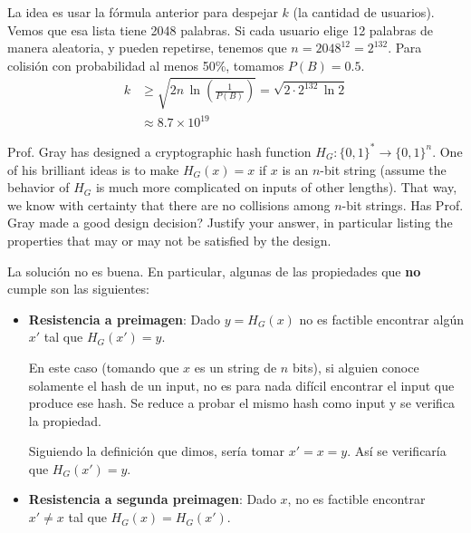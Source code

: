\documentclass[12pt,addpoints,answers]{exam}
\begin{document}
\begin{questions}
\begin{parts}
\begin{solution} %
    La idea es usar la fórmula anterior para despejar $k$ (la cantidad de usuarios).
    Vemos que esa lista tiene 2048 palabras. Si cada usuario elige 12 palabras de manera aleatoria, y 
    pueden repetirse, tenemos que $n = 2048^{12} = 2^{132}$. Para colisión con probabilidad al menos 50\%, tomamos $P(B)=0.5$.
    \begin{align*}
        k &\geq \sqrt{2n \, \ln\!\left(\tfrac{1}{P(B)}\right)} 
          = \sqrt{2 \cdot 2^{132} \, \ln 2} \\
          &\approx 8.7 \times 10^{19}
    \end{align*}
\end{solution}

\end{parts}

\newpage

\question[10] Prof. Gray has designed a cryptographic hash function $H_G : \{0, 1\}^\ast \rightarrow \{0, 1\}^n$. One of his brilliant ideas is to make $H_G(x) = x$ if $x$ is an $n$-bit string (assume the behavior of $H_G$ is much more complicated on inputs of other lengths). That way, we know with certainty that there are no collisions among $n$-bit strings. Has Prof. Gray made a good design decision? Justify your answer, in particular listing the properties that may or may not be satisfied by the design.

\begin{solution} %
   La solución no es buena.
   En particular, algunas de las propiedades que \textbf{no} cumple son las siguientes:
   \begin{itemize}
    \item \textbf{Resistencia a preimagen}: Dado $y = H_G(x)$ 
    no es factible encontrar algún $x'$ tal que $H_G(x') = y$.

    En este caso (tomando que $x$ es un string de $n$ bits), si alguien conoce solamente el hash
    de un input, no es para nada difícil encontrar el input que produce ese hash.
    Se reduce a probar el mismo hash como input y se verifica la propiedad. 
    
    Siguiendo la definición que dimos, sería tomar $x' = x = y$. 
    Así se verificaría que $H_G(x') = y$.

    \item \textbf{Resistencia a segunda preimagen}: Dado $x$, no es factible encontrar
    $x' \neq x$ tal que $H_G(x) = H_G(x')$. 


\end{itemize}
\end{solution}
\end{questions}
\end{document}
